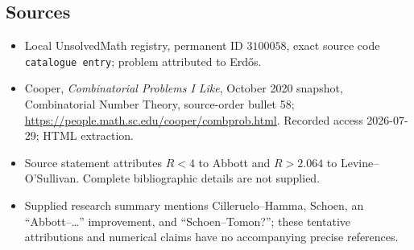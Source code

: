 \documentclass[11pt]{article}
\begin{document}
\subsection{Sources}
\begin{itemize}
\item Local UnsolvedMath registry, permanent ID \(3100058\), exact source code \texttt{catalogue entry}; problem attributed to Erdős.
\item Cooper, \emph{Combinatorial Problems I Like}, October 2020 snapshot, Combinatorial Number Theory, source-order bullet 58; \url{https://people.math.sc.edu/cooper/combprob.html}. Recorded access 2026-07-29; HTML extraction.
\item Source statement attributes \(R<4\) to Abbott and \(R>2.064\) to Levine--O'Sullivan. Complete bibliographic details are not supplied.
\item Supplied research summary mentions Cilleruelo--Hamma, Schoen, an ``Abbott--\ldots'' improvement, and ``Schoen--Tomon?''; these tentative attributions and numerical claims have no accompanying precise references.
\end{itemize}
\end{document}
